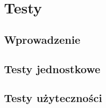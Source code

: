 \chapter{Testy}
\section{Wprowadzenie}

\lipsum[5]

\section{Testy jednostkowe}

\lipsum[5]

\section{Testy użyteczności}

\lipsum[5]

\thispagestyle{normal}
